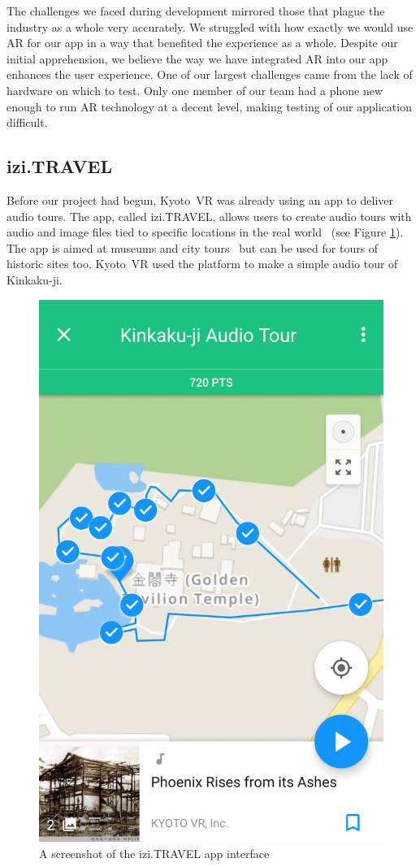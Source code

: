 \documentclass[a4paper, 10pt, american, titlepage]{article}
\begin{document}
The challenges we faced during development mirrored those that plague the
industry as a whole very accurately. We struggled with how exactly we would use
AR for our app in a way that benefited the experience as a whole. Despite our
initial apprehension, we believe the way we have integrated AR into our app
enhances the user experience. One of our largest challenges came from the lack
of hardware on which to test. Only one member of our team had a phone new enough
to run AR technology at a decent level, making testing of our application
difficult.

\subsection{izi.TRAVEL}
\label{sec:iziTravel}

Before our project had begun, Kyoto~VR was already using an app to deliver audio
tours. The app, called izi.TRAVEL, allows users to create audio tours with
audio and image files tied to specific locations in the real
world~\autocite{izitravel2015} (see Figure \ref{fig:iziTravel}). The app is
aimed at museums and city tours~\autocite{izitravel} but can be used for tours
of historic sites too. Kyoto~VR used the platform to make a simple audio tour
of Kinkaku-ji.

\begin{figure}[h]
	\centering
	\includegraphics[width=.5\textwidth]{izi-travel.png}
	\caption{A screenshot of the izi.TRAVEL app interface}
	\label{fig:iziTravel}
\end{figure}
\end{document}

